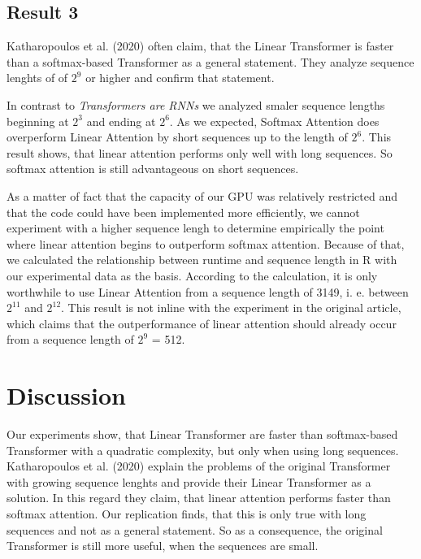 \documentclass[DIV=13,fontsize=11pt]{scrartcl}
\begin{document}
\subsection{Result 3}
Katharopoulos et al. (2020) often claim, that the Linear Transformer is faster than a softmax-based Transformer as a general statement. They analyze sequence lenghts of of \(2^9\) or higher and confirm that statement. 

In contrast to \textit{Transformers are RNNs} we analyzed smaler sequence lengths beginning at  \(2^3\) and ending at \(2^6\).  As we expected, Softmax Attention does overperform Linear Attention by short sequences up to the length of \(2^6\). This result shows, that linear attention performs only well with long sequences.  So softmax attention is still advantageous on short sequences.

As a matter of fact that the capacity of our GPU was relatively restricted and that the code could have been implemented more efficiently,  we cannot experiment with a higher sequence lengh to determine empirically the point where linear attention begins to outperform softmax attention.  Because of that, we calculated the relationship between runtime and sequence length in R with our experimental data as the basis. According to the calculation, it is only worthwhile to use Linear Attention from a sequence length of 3149, i. e.  between \(2^{11}\) and \(2^{12}\). This result is not inline with the experiment in the original article, which claims that the outperformance of linear attention should already occur from a sequence length of \(2^9\) = 512. 


\section{Discussion}
Our experiments show, that Linear Transformer are faster than softmax-based Transformer with a quadratic complexity, but only when using long sequences. Katharopoulos et al. (2020) explain the problems of the original Transformer with growing sequence lenghts and provide their Linear Transformer as a solution. In this regard they claim, that linear attention performs faster than softmax attention. Our replication finds, that this is only true with long sequences and not as a general statement. So as a consequence, the original Transformer is still more useful, when the sequences are small. 
\end{document}

